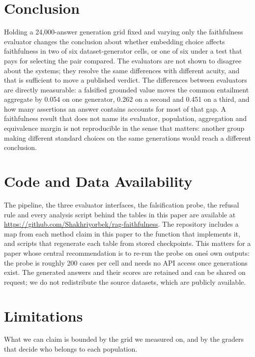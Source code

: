 \documentclass[11pt]{article}
\begin{document}
\section{Conclusion}
\label{sec:conclusion}

Holding a 24,000-answer generation grid fixed and varying only the faithfulness evaluator changes the conclusion about whether embedding choice affects faithfulness in two of six dataset-generator cells, or one of six under a test that pays for selecting the pair compared. The evaluators are not shown to disagree about the systems; they resolve the same differences with different acuity, and that is sufficient to move a published verdict. The differences between evaluators are directly measurable: a falsified grounded value moves the common entailment aggregate by 0.054 on one generator, 0.262 on a second and 0.451 on a third, and how many assertions an answer contains accounts for most of that gap. A faithfulness result that does not name its evaluator, population, aggregation and equivalence margin is not reproducible in the sense that matters: another group making different standard choices on the same generations would reach a different conclusion.

\section*{Code and Data Availability}

The pipeline, the three evaluator interfaces, the falsification probe, the refusal rule and every analysis script behind the tables in this paper are available at \url{https://github.com/Shakhriyorbek/rag-faithfulness}. The repository includes a map from each method claim in this paper to the function that implements it, and scripts that regenerate each table from stored checkpoints. This matters for a paper whose central recommendation is to re-run the probe on one\'s own outputs: the probe is roughly 200 cases per cell and needs no API access once generations exist. The generated answers and their scores are retained and can be shared on request; we do not redistribute the source datasets, which are publicly available.


\section*{Limitations}

What we can claim is bounded by the grid we measured on, and by the graders that decide who belongs to each population.
\end{document}
